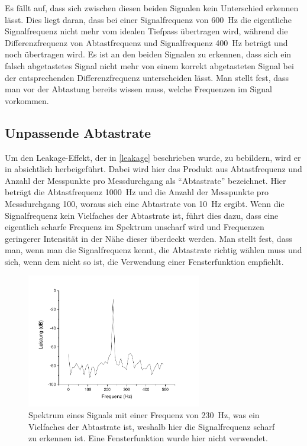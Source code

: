 \documentclass[
a4paper,
12pt,
pagesize,
ngerman
]{scrartcl}
\begin{document}
	Es fällt auf, dass sich zwischen diesen beiden Signalen kein Unterschied erkennen lässt.
	Dies liegt daran, dass bei einer Signalfrequenz von \SI{600}{\hertz} die eigentliche Signalfrequenz nicht mehr vom idealen Tiefpass übertragen wird, während die Differenzfrequenz von Abtastfrequenz und Signalfrequenz \SI{400}{\hertz} beträgt und noch übertragen wird.
	Es ist an den beiden Signalen zu erkennen, dass sich ein falsch abgetastetes Signal nicht mehr von einem korrekt abgetasteten Signal bei der entsprechenden Differenzfrequenz unterscheiden lässt.
	Man stellt fest, dass man vor der Abtastung bereits wissen muss, welche Frequenzen im Signal vorkommen. 
	
	\subsection{Unpassende Abtastrate}
	Um den Leakage-Effekt, der in \cref{leakage} beschrieben wurde, zu bebildern, wird er in  absichtlich herbeigeführt.
	Dabei wird hier das Produkt aus Abtastfrequenz und Anzahl der Messpunkte pro Messdurchgang als \enquote{Abtastrate} bezeichnet.
	Hier beträgt die Abtastfrequenz \SI{1000}{\hertz} und die Anzahl der Messpunkte pro Messdurchgang \num{100}, woraus sich eine Abtastrate von \SI{10}{\hertz} ergibt.
	Wenn die Signalfrequenz kein Vielfaches der Abtastrate ist, führt dies dazu, dass eine eigentlich scharfe Frequenz im Spektrum unscharf wird und Frequenzen geringerer Intensität in der Nähe dieser überdeckt werden.
	Man stellt fest, dass man, wenn man die Signalfrequenz kennt, die Abtastrate richtig wählen muss und sich, wenn dem nicht so ist, die Verwendung einer Fensterfunktion empfiehlt.
	
	\begin{figure}[H]  
		\includegraphics[width=0.68\textwidth]{Origin-Files/unpassend_230nonhann}
		\centering
		\caption{
			Spektrum eines Signals mit einer Frequenz von \SI{230}{\hertz}, was ein Vielfaches der Abtastrate ist, weshalb hier die Signalfrequenz scharf zu erkennen ist. Eine Fensterfunktion wurde hier nicht verwendet.
		}
		\label{fig_tag3_unpassend_230hz}
		\centering
	\end{figure}
	
\end{document}
